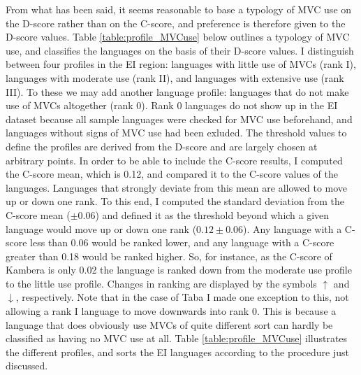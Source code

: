From what has been said, it seems reasonable to base a typology of MVC use on the D-score rather than on the C-score, and preference is therefore given to the D-score values. Table \ref{table:profile_MVCuse} below outlines a typology of MVC use, and classifies the languages on the basis of their D-score values. I distinguish between four profiles in the EI region: languages with little use of MVCs (rank I), languages with moderate use (rank II), and languages with extensive use (rank III). To these we may add another language profile: languages that do not make use of MVCs altogether (rank 0). Rank 0 languages do not show up in the EI dataset because all sample languages were checked for MVC use beforehand, and languages without signs of MVC use had been exluded. The threshold values to define the profiles are derived from the D-score and are largely chosen at arbitrary points. In order to be able to include the C-score results, I computed the C-score mean, which is 0.12, and compared it to the C-score values of the languages. Languages that strongly deviate from this mean are allowed to move up or down one rank. To this end, I computed the standard deviation from the C-score mean ($\pm 0.06$) and defined it as the threshold beyond which a given language would move up or down one rank ($0.12 \pm 0.06$). Any language with a C-score less than 0.06 would be ranked lower, and any language with a C-score greater than 0.18 would be ranked higher. So, for instance, as the C-score of Kambera is only 0.02 the language is ranked down from the moderate use profile to the little use profile. Changes in ranking are displayed by the symbols $\uparrow$ and $\downarrow$, respectively. Note that in the case of Taba I made one exception to this, not allowing a rank I language to move downwards into rank 0. This is because a language that does obviously use MVCs of quite different sort can hardly be classified as having no MVC use at all. Table \ref{table:profile_MVCuse} illustrates the different profiles, and sorts the EI languages according to the procedure just discussed.

